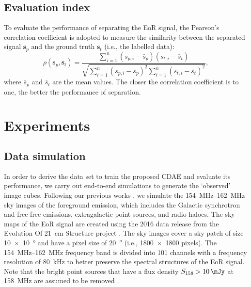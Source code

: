 \documentclass[letters,a4paper,fleqn,usenatbib]{mnras}
\begin{document}
\subsection{Evaluation index}
\label{sec:index}

To evaluate the performance of separating the EoR signal, the Pearson's
correlation coefficient is adopted to measure the similarity between
the separated signal $\mathbf{s}_p$ and the ground truth $\mathbf{s}_t$
(i.e., the labelled data):
\begin{equation}
  \label{eq:corrcoef}
  \rho(\mathbf{s}_p, \mathbf{s}_t) =
    \frac{\sum_{i=1}^{n}(s_{p,i}-\bar{s}_p)(s_{t,i}-\bar{s}_t)}{
      \sqrt{\sum_{i=1}^{n}(s_{p,i}-\bar{s}_p)^2
        \sum_{i=1}^{n}(s_{t,i}-\bar{s}_t)^2}
    },
\end{equation}
where $\bar{s}_p$ and $\bar{s}_t$ are the mean values.
The closer the correlation coefficient is to one, the better the
performance of separation.


\section{Experiments}
\label{sec:experiments}

\subsection{Data simulation}
\label{sec:simulation}

In order to derive the data set to train the proposed CDAE and evaluate
its performance, we carry out end-to-end simulations to generate the
`observed' image cubes.
Following our previous works \citep{wang2010,wang2013}, we simulate the
\SIrange{154}{162}{\MHz} sky images of the foreground emission,
which includes the Galactic synchrotron and free-free emissions,
extragalactic point sources, and radio haloes.
The sky maps of the EoR signal are created using the 2016 data release
from the Evolution Of 21~cm Structure project \citep{mesinger2016}.
The sky images cover a sky patch of size \SI{10 x 10}{\degree} and have
a pixel size of \SI{20}{\arcsecond} (i.e., \num{1800 x 1800} pixels).
The \SIrange{154}{162}{\MHz} frequency band is divided into 101
channels with a frequency resolution of \SI{80}{\kHz} to better
preserve the spectral structures of the EoR signal.
Note that the bright point sources that have a flux density
$S_{158} > \SI{10}{\mJy}$ at \SI{158}{\MHz} are assumed to be
removed \citep[e.g.,][]{liu2009ps}.
\end{document}
